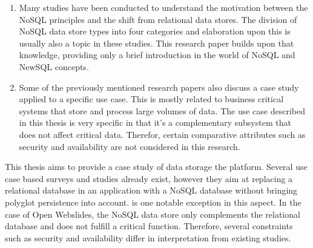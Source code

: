 \begin{enumerate}
  \item Many studies have been conducted to understand the motivation between the NoSQL principles and the shift from relational data stores. The division of NoSQL data store types into four categories and elaboration upon this is usually also a topic in these studies. This research paper builds upon that knowledge, providing only a brief introduction in the world of NoSQL and NewSQL concepts.
  \item Some of the previously mentioned research papers also discuss a case study applied to a specific use case. This is mostly related to business critical systems that store and process large volumes of data. The use case described in this thesis is very specific in that it's a complementary subsystem that does not affect critical data. Therefor, certain comparative attributes such as security and availability are not considered in this research.
\end{enumerate}


This thesis aims to provide a case study of data storage the \textcite{OpenWebslides2017} platform. Several use case based surveys and studies already exist, however they aim at replacing a relational database in an application with a NoSQL database without bringing polyglot persistence into account. \textcite{Sadalage2012} is one notable exception in this aspect. In the case of Open Webslides, the NoSQL data store only complements the relational database and does not fulfill a critical function. Therefore, several constraints such as security and availability differ in interpretation from existing studies.
